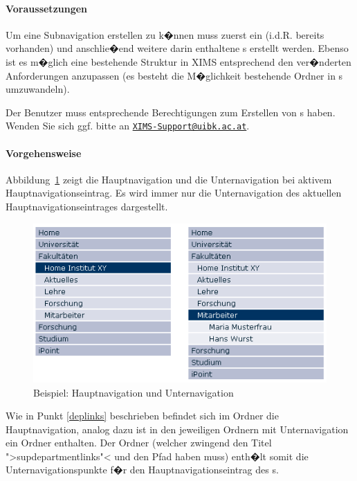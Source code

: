 \paragraph{Voraussetzungen}

Um eine Subnavigation erstellen zu k�nnen muss zuerst ein
 (i.d.R. bereits vorhanden) und anschlie�end weitere darin enthaltene s erstellt
werden. Ebenso ist es m�glich eine bestehende Struktur in XIMS
entsprechend den ver�nderten Anforderungen anzupassen (es besteht die
M�glichkeit bestehende Ordner in s
umzuwandeln).

\begin{Hinweis}
  Der Benutzer muss entsprechende Berechtigungen zum Erstellen von
  s haben. Wenden Sie sich ggf. bitte an
  \href{mailto:XIMS-Support@uibk.ac.at}{\nolinkurl{XIMS-Support@uibk.ac.at}}.
\end{Hinweis}

\paragraph{Vorgehensweise}

Abbildung~\ref{fig:subdeplinks} zeigt die Hauptnavigation und die
Unternavigation bei aktivem Hauptnavigationseintrag. Es wird immer nur
die Unternavigation des aktuellen Hauptnavigationseintrages
dargestellt.

\begin{figure}[!ht]
  \centering
  \includegraphics[scale=0.7]{./images/subdeplinks.png}
  \caption{Beispiel: Hauptnavigation und Unternavigation}
  \label{fig:subdeplinks}
\end{figure}

Wie in Punkt \ref{deplinks} beschrieben befindet sich im Ordner
 die Hauptnavigation, analog dazu ist in den
jeweiligen Ordnern mit Unternavigation ein Ordner
 enthalten. Der Ordner (welcher zwingend den Titel ">supdepartmentlinks"< und den
Pfad  haben muss) enth�lt somit die
Unternavigationspunkte f�r den Hauptnavigationseintrag des
s.

